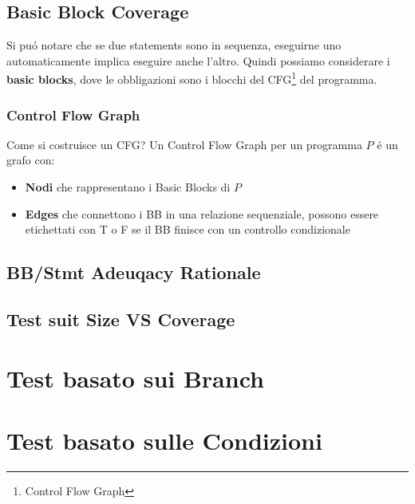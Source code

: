 \subsection{Basic Block Coverage}
Si puó notare che se due statements sono in sequenza, eseguirne uno automaticamente implica eseguire anche l'altro.
Quindi possiamo considerare i \textbf{basic blocks}, dove le obbligazioni sono i blocchi del CFG\footnote{Control Flow Graph} del programma.


\subsubsection{Control Flow Graph}
Come si costruisce un CFG?
Un Control Flow Graph per un programma $P$ é un grafo con:
\begin{itemize}
    \item \textbf{Nodi} che rappresentano i Basic Blocks di $P$
    \item \textbf{Edges} che connettono i BB in una relazione sequenziale, possono essere etichettati con T o F se il BB finisce con un controllo condizionale
\end{itemize}

\subsection{BB/Stmt Adeuqacy Rationale}

\subsection{Test suit Size VS Coverage}

\section{Test basato sui Branch}

\section{Test basato sulle Condizioni}